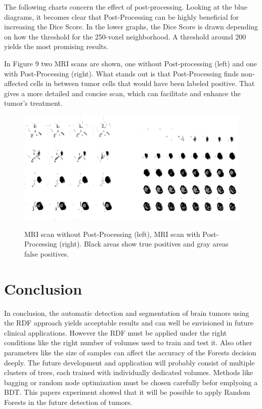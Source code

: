 \documentclass[
12pt,
headsepline,
bibliography=totoc,
twoside=semi,
]{scrartcl}
\begin{document}
 The following charts concern the effect of post-processing. Looking at the blue diagrams, it becomes clear that Post-Processing can be highly beneficial for increasing the Dice Score. In the lower graphs, the Dice Score is drawn depending on how the threshold for the 250-voxel neighborhood. A threshold around 200 yields the most promising results. 

 In Figure 9 two MRI scans are shown, one without Post-processing (left) and one with Post-Processing (right). What stands out is that Post-Processing finds non-affected cells in between tumor cells that would have been labeled positive. That gives a more detailed and concise scan, which can facilitate and enhance the tumor's treatment. 

 \begin{figure}[h]
 \centering \includegraphics[scale=0.5]{BDT19.png}\label{fig:fig19}
 \caption{MRI scan without Post-Processing (left), MRI scan with Post-Processing (right). Black areas show true positives and gray areas false positives.}
 \end{figure} 

\section{Conclusion\label{sec:sec5}}
  In conclusion, the automatic detection and segmentation of brain tumors using the RDF approach yields acceptable results and can well be envisioned in future clinical applications. However the RDF must be applied under the right conditions like the right number of volumes used to train and test it. Also other parameters like the size of samples can affect the accuracy of the Forests decision deeply. The future development and application will probably consist of multiple clusters of trees, each trained with individually dedicated volumes. Methods like bagging or random node optimization must be chosen carefully befor emplyoing a BDT. This papers experiment showed that it will be possible to apply Random Forests in the future detection of tumors. 
\end{document}
